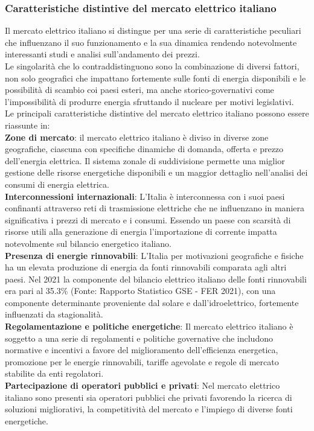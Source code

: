 \documentclass{article}
\begin{document}
\subsubsection{Caratteristiche distintive del mercato elettrico italiano}
Il mercato elettrico italiano si distingue per una serie di caratteristiche peculiari che influenzano il suo funzionamento e la sua dinamica rendendo notevolmente interessanti studi e analisi sull’andamento dei prezzi.\cite{ModelingRisk2021}\\
Le singolarità che lo contraddistinguono sono la combinazione di diversi fattori, non solo geografici che impattano fortemente sulle fonti di energia disponibili e le possibilità di scambio coi paesi esteri, ma anche storico-governativi come l’impossibilità di produrre energia sfruttando il nucleare per motivi legislativi.\\
Le principali caratteristiche distintive del mercato elettrico italiano possono essere riassunte in:\\
\textbf{Zone di mercato}: il mercato elettrico italiano è diviso in diverse zone geografiche, ciascuna con specifiche dinamiche di domanda, offerta e prezzo dell'energia elettrica. Il sistema zonale di suddivisione permette una miglior gestione delle risorse energetiche disponibili e un maggior dettaglio nell’analisi dei consumi di energia elettrica.\cite{A24_2021}\\
\textbf{Interconnessioni internazionali}: L'Italia è interconnessa con i suoi paesi confinanti attraverso reti di trasmissione elettriche che ne influenzano in maniera significativa i prezzi di mercato e i consumi. Essendo un paese con scarsità di risorse utili alla generazione di energia l’importazione di corrente impatta notevolmente sul bilancio energetico italiano.\cite{A24_2021}\\
\textbf{Presenza di energie rinnovabili}: L'Italia per motivazioni geografiche e fisiche ha un elevata produzione di energia da fonti rinnovabili comparata agli altri paesi. Nel 2021 la componente del bilancio elettrico italiano delle fonti rinnovabili era pari al 35.3\% (Fonte: Rapporto Statistico GSE - FER 2021), con una componente determinante proveniente dal solare e dall’idroelettrico, fortemente influenzati da stagionalità.\cite{ModelRenewable2020}\\
\textbf{Regolamentazione e politiche energetiche}: Il mercato elettrico italiano è soggetto a una serie di regolamenti e politiche governative che includono normative e incentivi a favore del miglioramento dell’efficienza energetica, promozione per le energie rinnovabili, tariffe agevolate e regole di mercato stabilite da enti regolatori.\\
\textbf{Partecipazione di operatori pubblici e privati}: Nel mercato elettrico italiano sono presenti sia operatori pubblici che privati favorendo la ricerca di soluzioni migliorativi, la competitività del mercato e l’impiego di diverse fonti energetiche.\\
\end{document}
